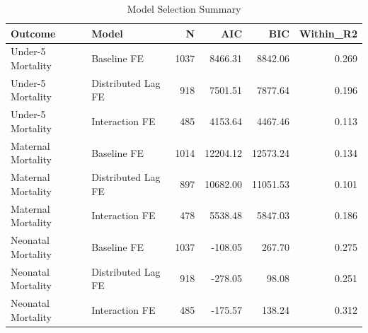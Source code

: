 \begin{table}

\caption{\label{tab:tab:model_selection}Model Selection Summary}
\centering
\begin{tabular}[t]{llrrrr}
\toprule
Outcome & Model & N & AIC & BIC & Within\_R2\\
\midrule
Under-5 Mortality & Baseline FE & 1037 & 8466.31 & 8842.06 & 0.269\\
Under-5 Mortality & Distributed Lag FE & 918 & 7501.51 & 7877.64 & 0.196\\
Under-5 Mortality & Interaction FE & 485 & 4153.64 & 4467.46 & 0.113\\
Maternal Mortality & Baseline FE & 1014 & 12204.12 & 12573.24 & 0.134\\
Maternal Mortality & Distributed Lag FE & 897 & 10682.00 & 11051.53 & 0.101\\
\addlinespace
Maternal Mortality & Interaction FE & 478 & 5538.48 & 5847.03 & 0.186\\
Neonatal Mortality & Baseline FE & 1037 & -108.05 & 267.70 & 0.275\\
Neonatal Mortality & Distributed Lag FE & 918 & -278.05 & 98.08 & 0.251\\
Neonatal Mortality & Interaction FE & 485 & -175.57 & 138.24 & 0.312\\
\bottomrule
\end{tabular}
\end{table}
